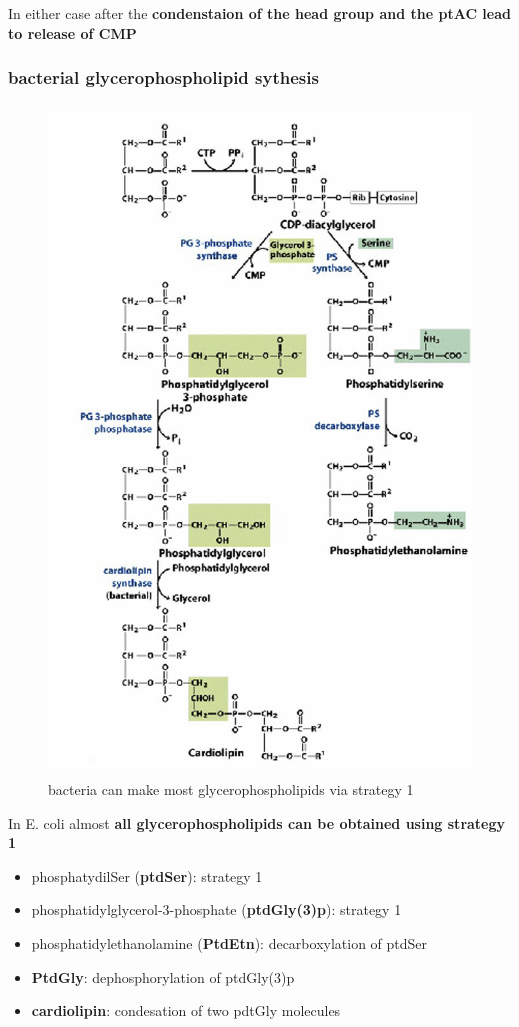 \documentclass[../main.tex]{subfiles}
\begin{document}
In either case after the\textbf{ condenstaion of the head group and the ptAC lead to release of CMP}

\subsubsection{bacterial glycerophospholipid sythesis}
\begin{figure}[H]
    \centering
    \includegraphics[width=0.5\linewidth]{bacteria_lipids.png}
    \caption{bacteria can make most glycerophospholipids via strategy 1}
    \label{fig:enter-label}
\end{figure}
In E. coli almost \textbf{all glycerophospholipids can be obtained using strategy 1}
\begin{itemize}
    \item phosphatydilSer (\textbf{ptdSer}): strategy 1
    \item phosphatidylglycerol-3-phosphate (\textbf{ptdGly(3)p}): strategy 1
    \item phosphatidylethanolamine (\textbf{PtdEtn}): decarboxylation of ptdSer
    \item \textbf{PtdGly}: dephosphorylation of ptdGly(3)p
    \item \textbf{cardiolipin}: condesation of two pdtGly molecules
\end{itemize}
   
\end{document}

